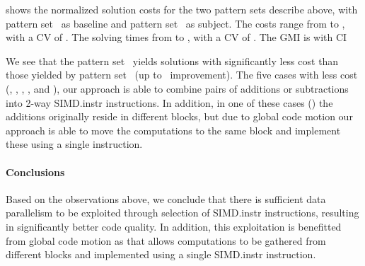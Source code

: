  shows the normalized \gls{solution}
costs for the two \glspl{pattern set} describe above, with \gls{pattern
  set}~ as \gls{baseline} and \gls{pattern
  set}~ as \gls{subject}.
%
The costs range from
\printMinCycles{%
  \SimdVsWithoutCyclesSpeedupCyclesAvgMin,
  \SimdVsWithoutCyclesSpeedupBaselineCyclesAvgMin
} to
\printMaxCycles{%
  \SimdVsWithoutCyclesSpeedupCyclesAvgMax,
  \SimdVsWithoutCyclesSpeedupBaselineCyclesAvgMax
}, with a \gls{CV} of
\numMaxOf{
  \SimdVsWithoutCyclesSpeedupCyclesCvMax,
  \SimdVsWithoutCyclesSpeedupBaselineCyclesCvMax
}.
%
The solving times from
\printMinSolvingTime{%
  \SimdVsWithoutCyclesSpeedupPrePlusSolvingTimeAvgMin,
  \SimdVsWithoutCyclesSpeedupBaselinePrePlusSolvingTimeAvgMin
} to
\printMaxSolvingTime{%
  \SimdVsWithoutCyclesSpeedupPrePlusSolvingTimeAvgMax,
  \SimdVsWithoutCyclesSpeedupBaselinePrePlusSolvingTimeAvgMax
}, with a \gls{CV} of
\numMaxOf{
  \SimdVsWithoutCyclesSpeedupPrePlusSolvingTimeCvMax,
  \SimdVsWithoutCyclesSpeedupBaselinePrePlusSolvingTimeCvMax
}.
%
The \gls{GMI} is \printGMI{%
  \SimdVsWithoutCyclesSpeedupCyclesRegularSpeedupGmean%
} with \gls{CI}~\printGMICI{%
  \SimdVsWithoutCyclesSpeedupCyclesRegularSpeedupCiMin%
}{%
  \SimdVsWithoutCyclesSpeedupCyclesRegularSpeedupCiMax%
}

We see that the \gls{pattern set}~ yields \glspl{solution}
with significantly less cost than those yielded by \gls{pattern
  set}~ (up to~\printSpeedup{%
  \SimdVsWithoutCyclesSpeedupCyclesZeroCenteredSpeedupMax%
} improvement).
%
The five cases with less cost (,
, , , and
), our approach is able to combine pairs of additions or
subtractions into \num{2}-way \gls{SIMD.instr} \glspl{instruction}.
%
In addition, in one of these cases () the additions
originally reside in different \glspl{block}, but due to \gls{global code
  motion} our approach is able to move the computations to the same \gls{block}
and implement these using a single \gls{instruction}.


\paragraph{Conclusions}

Based on the observations above, we conclude that there is sufficient data
parallelism to be exploited through selection of \gls{SIMD.instr}
\glspl{instruction}, resulting in significantly better code quality.
%
In addition, this exploitation is benefitted from \gls{global code motion} as
that allows computations to be gathered from different \glspl{block} and
implemented using a single \gls{SIMD.instr} \gls{instruction}.
